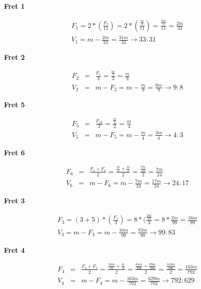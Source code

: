 \textbf{Fret 1}

\begin{eqnarray*}
F_{1} =
    2 * ( \frac{F_{7}}{11} ) =
    2 * ( \frac{\frac{m}{3}}{11} ) =
    \frac{\frac{2m}{3}}{11} =
    \frac{2m}{33} \\
V_{1} =
    m - \frac{2m}{33} =
    \frac{31m}{33}
    \to 33:31
\end{eqnarray*}

\textbf{Fret 2}

\begin{eqnarray*}
    F_{2}
        &=& \frac{F_{7}}{3}
        = \frac{\frac{m}{3}}{3}
        = \frac{m}{9} \\
    V_{2}
        &=& m - F_{2}
        = m - \frac{m}{9}
        = \frac{8m}{9}
        \to 9:8
\end{eqnarray*}

\textbf{Fret 5}

\begin{eqnarray*}\label{Gr-5}
    F_{5}
        &=& \frac{F_{12}}{2}
        = \frac{\frac{m}{2}}{2}
        = \frac{m}{4} \\
    V_{5}
        &=& m - F_{5}
        = m - \frac{m}{4}
        = \frac{3m}{4}
        \to 4:3
\end{eqnarray*}

\textbf{Fret 6}

\begin{eqnarray*}
    F_{6}
        &=& \frac{F_{5} + F_{7}}{2}
        = \frac{\frac{m}{4} + \frac{m}{3}}{2}
        = \frac{\frac{7m}{12}}{2}
        = \frac{7m}{24} \\
    V_{6}
        &=& m - F_{6}
        = m - \frac{7m}{24}
        = \frac{17m}{24}
        \to 24:17
\end{eqnarray*}

\textbf{Fret 3}

\begin{eqnarray*}
F_{3} =
    (3 + 5) * (\frac{F_{1}}{3}) =
    8 * (\frac{\frac{2m}{33}}{3} =
    8 * \frac{2m}{99} =
    \frac{16m}{99} \\
V_{3} =
    m - F_{3} =
    m - \frac{16m}{99} = \frac{83m}{99}
    \to 99:83
\end{eqnarray*}

\textbf{Fret 4}

\begin{eqnarray*}
    F_{4}
        &=& \frac{F_{3} + F_{5}}{2}
        = \frac{\frac{16m}{99} + \frac{m}{9}}{2}
        = \frac{\frac{64m}{396} + \frac{99m}{396}}{2}
        = \frac{\frac{163m}{396}}{2}
        = \frac{163m}{792} \\
    V_{4}
        &=& m - F_{4}
        = m - \frac{163m}{792}
        = \frac{629m}{792}
        \to 792:629
\end{eqnarray*}

